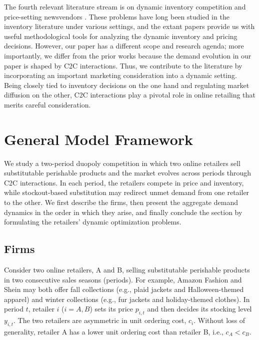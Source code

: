 \documentclass[nonblindrev,copyedit]{informs1}
\begin{document}
The fourth relevant literature stream is on dynamic inventory competition \citep[see, e.g.,][]{hp2000,lsw2007,nagarajan2008,nagarajan2009,olsen2008,olsen2014} and price-setting newsvendors \citep[see, e.g.,][]{pd1999,za2008,sa2011}. These problems have long been studied in the inventory literature under various settings, and the extant papers provide us with useful methodological tools for analyzing the dynamic inventory and pricing decisions. However, our paper has a different scope and research agenda; more importantly, we differ from the prior works because the demand evolution in our paper is shaped by C2C interactions. Thus, we contribute to the literature by incorporating an important marketing consideration into a dynamic setting. Being closely tied to inventory decisions on the one hand and regulating market diffusion on the other, C2C interactions play a pivotal role in online retailing that merits careful consideration.

\section{General Model Framework}\label{model:framework}

We study a two-period duopoly competition in which two online retailers sell substitutable perishable products and the market evolves across periods through C2C interactions. In each period, the retailers compete in price and inventory, while stockout-based substitution may redirect unmet demand from one retailer to the other. We first describe the firms, then present the aggregate demand dynamics in the order in which they arise, and finally conclude the section by formulating the retailers' dynamic optimization problems.

\subsection{Firms}

Consider two online retailers, A and B, selling substitutable perishable products in two consecutive sales seasons (periods). For example, Amazon Fashion and Shein may both offer fall collections (e.g., plaid jackets and Halloween-themed apparel) and winter collections (e.g., fur jackets and holiday-themed clothes). In period $t$, retailer $i$ ($i=A,B$) sets its price $p_{i,t}$ and then decides its stocking level $y_{i,t}$. The two retailers are asymmetric in unit ordering cost, $c_i$. Without loss of generality, retailer A has a lower unit ordering cost than retailer B, i.e., $c_A<c_B$.
\end{document}

